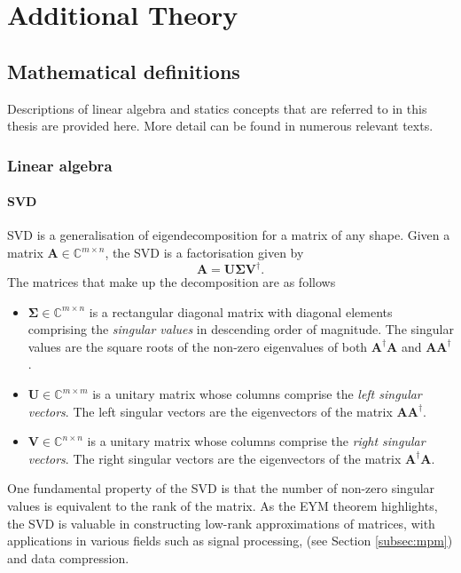 \chapter{Additional Theory}

\section{Mathematical definitions}

Descriptions of linear algebra and statics concepts that are referred to in
this thesis are provided here. More detail can be found in numerous relevant
texts\cite{Strang2018,Pawitan2001}.

\subsection{Linear algebra}
\label{subsec:linear-algebra}


\subsubsection{\Acl{SVD}}
\ac{SVD} is a generalisation of eigendecomposition for a matrix of any shape.
Given a matrix $\symbf{A} \in \mathbb{C}^{m \times n}$, the \ac{SVD} is a
factorisation given by
\begin{equation}
    \symbf{A} = \symbf{U} \symbf{\Sigma} \symbf{V}^{\dagger}.
\end{equation}
The matrices that make up the decomposition are as follows
\begin{itemize}[label={}]
    \item $\symbf{\Sigma} \in \mathbb{C}^{m \times n}$ is a rectangular
        diagonal matrix with diagonal elements comprising the \emph{singular
        values} in descending order of magnitude. The singular values are the
        square roots of the non-zero eigenvalues of both
        $\symbf{A}^{\dagger}\symbf{A}$ and
        $\symbf{A}\symbf{A}^{\dagger}$.
    \item $\symbf{U} \in \mathbb{C}^{m \times m}$ is a unitary matrix whose columns
        comprise the \emph{left singular vectors}. The left singular vectors
        are the eigenvectors of the matrix $\symbf{A}\symbf{A}^{\dagger}$.
    \item $\symbf{V} \in \mathbb{C}^{n \times n}$ is a unitary matrix whose columns
        comprise the \emph{right singular vectors}. The right singular vectors
        are the eigenvectors of the matrix $\symbf{A}^{\dagger}\symbf{A}$.
\end{itemize}
One fundamental property of the \ac{SVD} is that the number of non-zero
singular values is equivalent to the rank of the matrix. As the \ac{EYM}
theorem highlights, the \ac{SVD} is valuable in constructing low-rank
approximations of matrices, with applications in various fields such as signal
processing, (see Section \ref{subsec:mpm}) and data compression.


